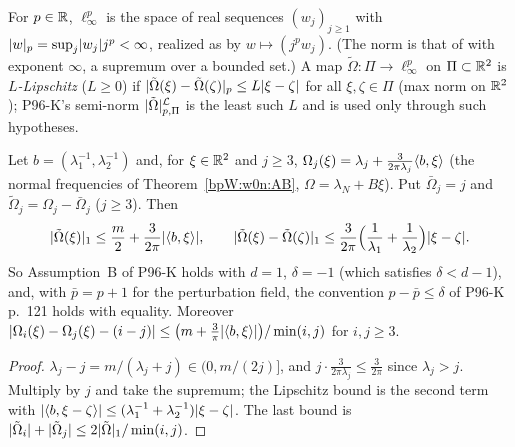 \begin{definition}\label{bpW:w1:linfty}
For $p\in\mathbb{R}$, $\ell^p_\infty$ is the space of real sequences $(w_j)_{j\ge1}$ with
$\lvert w\rvert_p=\sup_j\lvert w_j\rvert j^p<\infty$, realized as  by $w\mapsto(j^pw_j)$. (The norm is that of
 with exponent $\infty$, a supremum over a bounded set.) A map $\tilde\Omega:\Pi\to\ell^p_\infty$ on $\Pi\subset\mathbb{R}^2$ is
\emph{$L$-Lipschitz} ($L\ge0$) if $\lvert \tilde\Omega(\xi)-\tilde\Omega(\zeta)\rvert_p\le L\lvert \xi-\zeta\rvert$ for all
$\xi,\zeta\in\Pi$ (max norm on $\mathbb{R}^2$); P96-K's semi-norm $\lvert \tilde\Omega\rvert^{\mathcal L}_{p,\Pi}$ is the least such
$L$ and is used only through such hypotheses.
\end{definition}

\begin{lemma}\label{bpW:w1:tails}
Let $b=(\lambda_1^{-1},\lambda_2^{-1})$ and, for $\xi\in\mathbb{R}^2$ and $j\ge3$,
$\Omega_j(\xi)=\lambda_j+\frac{3}{2\pi\lambda_j}\langle b,\xi\rangle$ (the normal frequencies of Theorem~\ref{bpW:w0n:AB},
$\Omega=\lambda_N+B\xi$). Put $\bar\Omega_j=j$ and $\tilde\Omega_j=\Omega_j-\bar\Omega_j$ ($j\ge3$). Then
\[\lvert \tilde\Omega(\xi)\rvert_1\le\frac m2+\frac{3}{2\pi}\lvert \langle b,\xi\rangle\rvert,\qquad
\lvert \tilde\Omega(\xi)-\tilde\Omega(\zeta)\rvert_1\le\frac{3}{2\pi}\Bigl(\frac1{\lambda_1}+\frac1{\lambda_2}\Bigr)\lvert \xi-\zeta\rvert.\]
So Assumption~B of P96-K holds with $d=1$, $\delta=-1$ (which satisfies $\delta<d-1$), and, with $\bar p=p+1$ for the
perturbation field, the convention $p-\bar p\le\delta$ of P96-K p.~121 holds with equality. Moreover
$\lvert \Omega_i(\xi)-\Omega_j(\xi)-(i-j)\rvert\le\bigl(m+\frac3\pi\lvert \langle b,\xi\rangle\rvert\bigr)/\min(i,j)$ for $i,j\ge3$.
\end{lemma}

\begin{proof}
$\lambda_j-j=m/(\lambda_j+j)\in(0,m/(2j)]$, and $j\cdot\frac{3}{2\pi\lambda_j}\le\frac3{2\pi}$ since $\lambda_j>j$.
Multiply by $j$ and take the supremum; the Lipschitz bound is the second term with $\lvert \langle b,\xi-\zeta\rangle\rvert\le
(\lambda_1^{-1}+\lambda_2^{-1})\lvert \xi-\zeta\rvert$. The last bound is $\lvert \tilde\Omega_i\rvert+\lvert \tilde\Omega_j\rvert\le
2\lvert \tilde\Omega\rvert_1/\min(i,j)$.
\end{proof}

